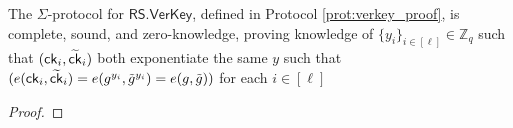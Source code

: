 \begin{theorem}
    The $\Sigma$-protocol for $\mathsf{RS.VerKey}$, defined in Protocol \ref{prot:verkey_proof}, is complete, sound, and zero-knowledge, proving knowledge of $\{y_i\}_{i \in [\ell]} \in \mathbb{Z}_q$ such that $(\mathsf{ck}_i, \widetilde{\mathsf{ck}}_i)$ both exponentiate the same $y$ such that $(e(\mathsf{ck}_i, \widetilde{\mathsf{ck}}_i) = e(g^{y_i}, \tilde{g}^{y_i}) = e(g, \tilde{g}))$ for each $i \in [\ell]$
\end{theorem}

\begin{proof}
    



\end{proof}
